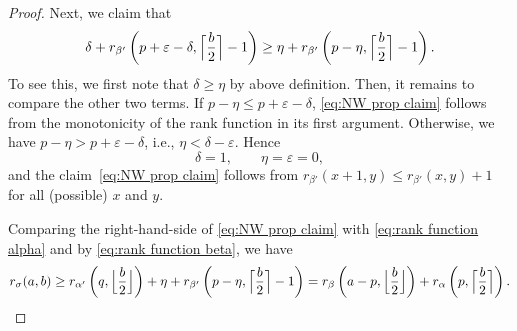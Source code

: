 \documentclass[12pt]{amsart}
\DeclarePairedDelimiter\ceil{\lceil}{\rceil}
\DeclarePairedDelimiter\floor{\lfloor}{\rfloor}
\theoremstyle{definition}
\numberwithin{equation}{section}
\begin{document}
\begin{proof}
Next, we claim that
\begin{equation}\label{eq:NW prop claim}
\delta+
r_{\beta'}\left(
p+\varepsilon-\delta,
\ceil[\Big]{\frac{b}{2}}-1
\right)
\geq
\eta+
r_{\beta'}\left(
p-\eta,
\ceil[\Big]{\frac{b}{2}}-1
\right).
\end{equation}
To see this, we first note that $\delta \geq \eta$ by above definition. Then, it remains to compare the other two terms.
If $p-\eta\leq p+\varepsilon-\delta$, \eqref{eq:NW prop claim} follows from the monotonicity of the rank function in its first argument. Otherwise, we have $p-\eta > p+\varepsilon-\delta$, i.e., $\eta < \delta -\varepsilon$. Hence
\begin{equation*}
\delta=1,
\qquad
\eta=\varepsilon=0,
\end{equation*}
and the claim~\eqref{eq:NW prop claim} follows from $r_{\beta'}(x+1,y)\leq r_{\beta'}(x,y)+1$ for all (possible) $x$ and $y$.

Comparing the right-hand-side of \eqref{eq:NW prop claim} with \eqref{eq:rank function alpha} and by \eqref{eq:rank function beta}, we have
\begin{equation*}
r_\sigma(a,b)
\geq{}
r_{\alpha'}\left(
q,
\floor[\Big]{\frac{b}{2}}
\right)
+
\eta+
r_{\beta'}\left(
p-\eta,
\ceil[\Big]{\frac{b}{2}}-1
\right)
={}
r_\beta\left(
a-p,\floor[\Big]{\frac{b}{2}}
\right)
+
r_\alpha\left(
p,\ceil[\Big]{\frac{b}{2}}
\right).
\end{equation*}


\end{proof}
\end{document}
